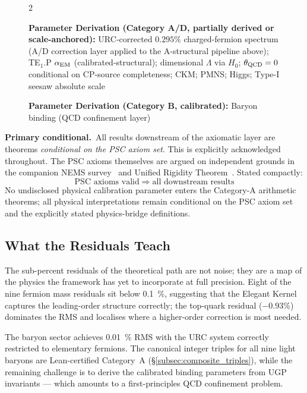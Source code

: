 \documentclass[11pt]{article}
\theoremstyle{remark}
\begin{document}
\begin{figure}[p]
\begin{tcolorbox}[colback=gray!7,colframe=black!40,title={\textbf{Axioms $\boldsymbol{\to}$ SM Parameters: Constructive Pipeline}},fonttitle=\small\bfseries,left=6pt,right=6pt,top=4pt,bottom=4pt]
\begin{multicols}{2}
\medskip

\textbf{Parameter Derivation (Category A/D, partially derived or scale-anchored):}
URC-corrected $0.295\%$ charged-fermion spectrum (A/D correction layer applied to the A-structural pipeline above); TE$_1$.P $\alpha_{\rm EM}$ (calibrated-structural); dimensional $\Lambda$ via $H_0$; $\theta_{\rm QCD}=0$ conditional on CP-source completeness; CKM; PMNS; Higgs; Type-I seesaw absolute scale

\medskip

\textbf{Parameter Derivation (Category B, calibrated):}
Baryon binding (QCD confinement layer)
\end{multicols}
\end{tcolorbox}
\end{figure}

\medskip
\noindent\textbf{Primary conditional.}~All results downstream of the axiomatic layer are theorems \emph{conditional on the PSC axiom set}.
This is explicitly acknowledged throughout.
The PSC axioms themselves are argued on independent grounds in the companion NEMS survey~\cite{SpivackNEMS88} and Unified Rigidity Theorem~\cite{SpivackUnifiedRigidity}.
Stated compactly:
\begin{equation}
  \boxed{\;\text{PSC axioms valid} \;\Longrightarrow\; \text{all downstream results}\;}
  \label{eq:primary_conditional}
\end{equation}
No undisclosed physical calibration parameter enters the Category-A arithmetic theorems; all physical interpretations remain conditional on the PSC axiom set and the explicitly stated physics-bridge definitions.

\subsection{What the Residuals Teach}

The sub-percent residuals of the theoretical path are not noise; they are a map of the physics the framework has yet to incorporate at full precision.
Eight of the nine fermion mass residuals sit below \SI{0.1}{\percent}, suggesting that the Elegant Kernel captures the leading-order structure correctly; the top-quark residual ($-0.93\%$) dominates the RMS and localises where a higher-order correction is most needed.

The baryon sector achieves \SI{0.01}{\percent} RMS with the URC system correctly restricted to elementary fermions.
The canonical integer triples for all nine light baryons are Lean-certified Category~A (\S\ref{subsec:composite_triples}), while the remaining challenge is to derive the calibrated binding parameters from UGP invariants --- which amounts to a first-principles QCD confinement problem.
\end{document}
